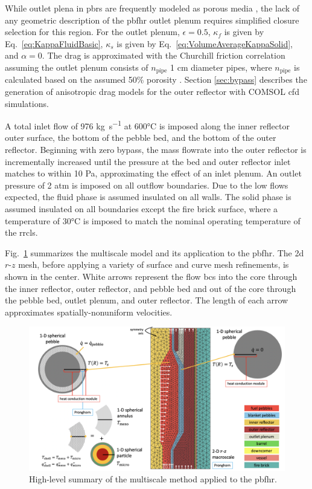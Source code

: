 While outlet plena in \glspl{pbr} are frequently modeled as porous media \cite{ximing}, the lack of any geometric description of the \gls{pbfhr} outlet plenum requires simplified closure selection for this region. For the outlet plenum, \(\epsilon=0.5\), \(\kappa_f\) is given by Eq.\ \eqref{eq:KappaFluidBasic}, \(\kappa_s\) is given by Eq.\ \eqref{eq:VolumeAverageKappaSolid}, and \(\alpha=0\). The drag is approximated with the Churchill friction correlation assuming the outlet plenum consists of \(n_\text{pipe}\) 1 \si{\centi\meter} diameter pipes, where \(n_\text{pipe}\) is calculated based on the assumed 50\% porosity \cite{churchill}. Section \ref{sec:bypass} describes the generation of anisotropic drag models for the outer reflector with COMSOL \gls{cfd} simulations.

A total inlet flow of 976 \si{\kilo\gram\per\second} at 600\si{\celsius} is imposed along the inner reflector outer surface, the bottom of the pebble bed, and the bottom of the outer reflector. Beginning with zero bypass, the mass flowrate into the outer reflector is incrementally increased until the pressure at the bed and outer reflector inlet matches to within 10 \si{\pascal}, approximating the effect of an inlet plenum. An outlet pressure of 2 atm is imposed on all outflow boundaries. Due to the low flows expected, the fluid phase is assumed insulated on all walls. The solid phase is assumed insulated on all boundaries except the fire brick surface, where a temperature of 30\si{\celsius} is imposed to match the nominal operating temperature of the \gls{rrcls}. 

Fig.\ \ref{fig:high_level} summarizes the multiscale model and its application to the \gls{pbfhr}. The \gls{2d} $r$-$z$ mesh, before applying a variety of surface and curve mesh refinements, is shown in the center. White arrows represent the flow \glspl{bc} into the core through the inner reflector, outer reflector, and pebble bed and out of the core through the pebble bed, outlet plenum, and outer reflector. The length of each arrow approximates spatially-nonuniform velocities.

\begin{figure}[h!]
\centering
\includegraphics[width=\linewidth]{figs/high_level_pbfhr.png}
\caption{High-level summary of the multiscale method applied to the \gls{pbfhr}.}
\label{fig:high_level}
\end{figure}

